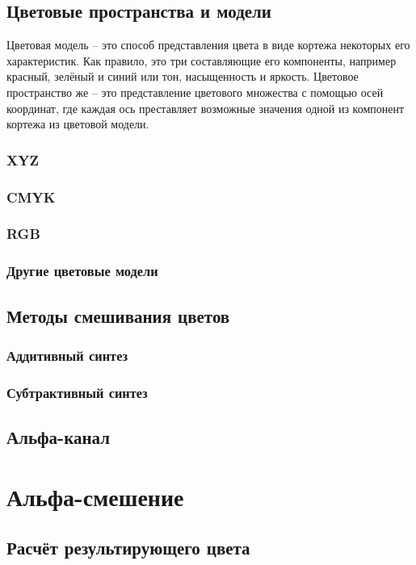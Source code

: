 \subsection {Цветовые пространства и модели}
Цветовая модель -- это способ представления цвета в виде кортежа некоторых его характеристик. Как правило, это три составляющие его компоненты, например красный, зелёный и синий или тон, насыщенность и яркость. Цветовое пространство же -- это представление цветового множества с помощью осей координат, где каждая ось преставляет возможные значения одной из компонент кортежа из цветовой модели. 

\subsubsection{XYZ}

\subsubsection{CMYK}
\subsubsection{RGB}
\subsubsection{Другие цветовые модели}
\subsection{Методы смешивания цветов}
\subsubsection{Аддитивный синтез}
\subsubsection{Субтрактивный синтез}
\subsection{Альфа-канал}

\section{Альфа-смешение}

\subsection{Расчёт результирующего цвета}


